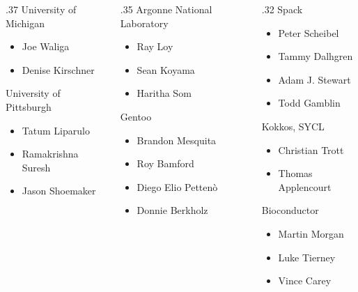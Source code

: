 \documentclass[
aspectratio=169,
xcolor={usenames}
]{beamer}
\begin{document}
{\begin{frame}
\begin{columns}[T]
\begin{column}{.37\framewidth}
      University of Michigan
      \begin{itemize}
      \item Joe Waliga
      \item Denise Kirschner
      \end{itemize}

      University of Pittsburgh
      \begin{itemize}
      \item Tatum Liparulo
      \item Ramakrishna Suresh
      \item Jason Shoemaker
      \end{itemize}
    \end{column}
    \begin{column}{.35\framewidth}
      \vspace{3.5\baselineskip}
      Argonne National Laboratory
      \begin{itemize}
      \item Ray Loy
      \item Sean Koyama
      \item Haritha Som
      \end{itemize}
      Gentoo
      \begin{itemize}
      \item Brandon Mesquita
      \item Roy Bamford
      \item Diego Elio Petten\`o
      \item Donnie Berkholz
      \end{itemize}
    \end{column}
    \begin{column}{.32\framewidth}
      Spack
      \begin{itemize}
      \item Peter Scheibel
      \item Tammy Dalhgren
      \item Adam J. Stewart
      \item Todd Gamblin
      \end{itemize}

      Kokkos, SYCL
      \begin{itemize}
      \item Christian Trott
      \item Thomas Applencourt
      \end{itemize}

      Bioconductor
      \begin{itemize}
      \item Martin Morgan
      \item Luke Tierney
      \item Vince Carey
      \end{itemize}
    \end{column}
  \end{columns}
\end{frame}
}
\end{document}
